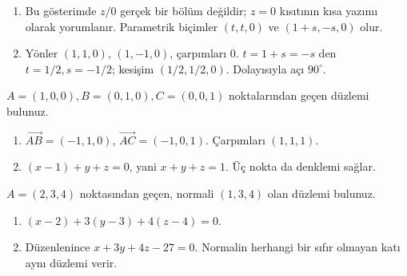 \begin{tcolorbox}[title={Adım adım çözüm},colback=green!3!white,colframe=green]\begin{enumerate}
\item Bu gösterimde \(z/0\) gerçek bir bölüm değildir; \(z=0\) kısıtının kısa yazımı olarak yorumlanır. Parametrik biçimler \((t,t,0)\) ve \((1+s,-s,0)\) olur.
\item Yönler \((1,1,0)\), \((1,-1,0)\), çarpımları 0. \(t=1+s=-s\) den \(t=1/2,s=-1/2\); kesişim \((1/2,1/2,0)\). Dolayısıyla açı \(90^\circ\).
\end{enumerate}\end{tcolorbox}
\begin{tcolorbox}[title={Örnek 2.4 | Koordinat eksenlerini kesen düzlem},colframe=accent]\(A=(1,0,0),B=(0,1,0),C=(0,0,1)\) noktalarından geçen düzlemi bulunuz.
\par{}\end{tcolorbox}
\begin{tcolorbox}[title={Adım adım çözüm},colback=green!3!white,colframe=green]\begin{enumerate}
\item \(\overrightarrow{AB}=(-1,1,0)\), \(\overrightarrow{AC}=(-1,0,1)\). Çarpımları \((1,1,1)\).
\item \((x-1)+y+z=0\), yani \(x+y+z=1\). Üç nokta da denklemi sağlar.
\end{enumerate}\end{tcolorbox}
\begin{tcolorbox}[title={Örnek 2.5 | Nokta ve normal ile düzlem},colframe=accent]\(A=(2,3,4)\) noktasından geçen, normali \((1,3,4)\) olan düzlemi bulunuz.
\par{}\end{tcolorbox}
\begin{tcolorbox}[title={Adım adım çözüm},colback=green!3!white,colframe=green]\begin{enumerate}
\item \((x-2)+3(y-3)+4(z-4)=0\).
\item Düzenlenince \(x+3y+4z-27=0\). Normalin herhangi bir sıfır olmayan katı aynı düzlemi verir.
\end{enumerate}\end{tcolorbox}
